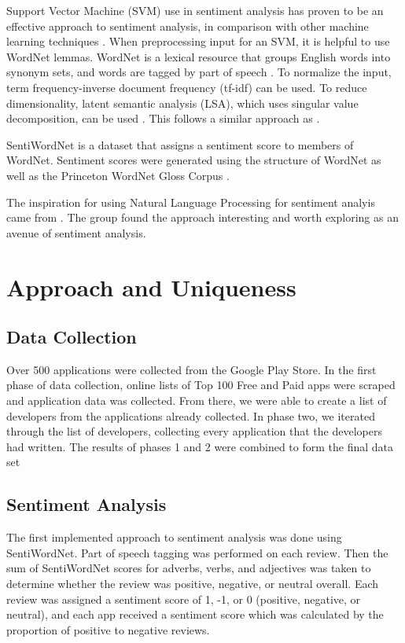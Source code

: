 \documentclass{acm_proc_article-sp}
\begin{document}
Support Vector Machine (SVM) use in sentiment analysis has proven to be an effective approach to sentiment analysis, in comparison with other machine learning techniques \cite{Pang02thumbsup}.  When preprocessing input for an SVM, it is helpful to use WordNet lemmas.  WordNet is a lexical resource that groups English words into synonym sets, and words are tagged by part of speech \cite{Miller}.  To normalize the input, term frequency-inverse document frequency (tf-idf) can be used.  To reduce dimensionality, latent semantic analysis (LSA), which uses singular value decomposition, can be used \cite{Deerwester90indexingby}.  This follows a similar approach as \cite{Mullen04sentimentanalysis}.

SentiWordNet is a dataset that assigns a sentiment score to members of WordNet.  Sentiment scores were generated using the structure of WordNet as well as the Princeton WordNet Gloss Corpus \cite{Baccianella10sentiwordnet}.

The inspiration for using Natural Language Processing for sentiment analyis came from \cite{Pandita:2013:WTA:2534766.2534812}. The group found the approach interesting and worth exploring as an avenue of sentiment analysis.

\section{Approach and Uniqueness}
\subsection{Data Collection}
Over 500 applications were collected from the Google Play Store. In the first phase of data collection, online lists of Top 100 Free and Paid apps were scraped and application data was collected. From there, we were able to create a list of developers from the applications already collected. In phase two, we iterated through the list of developers, collecting every application that the developers had written. The results of phases 1 and 2 were combined to form the final data set  
\subsection{Sentiment Analysis}
The first implemented approach to sentiment analysis was done using SentiWordNet.  Part of speech tagging was performed on each review. Then the sum of SentiWordNet scores for adverbs, verbs, and adjectives was taken to determine whether the review was positive, negative, or neutral overall.  Each review was assigned a sentiment score of 1, -1, or 0 (positive, negative, or neutral), and each app received a sentiment score which was calculated by the proportion of positive to negative reviews.
\end{document}
